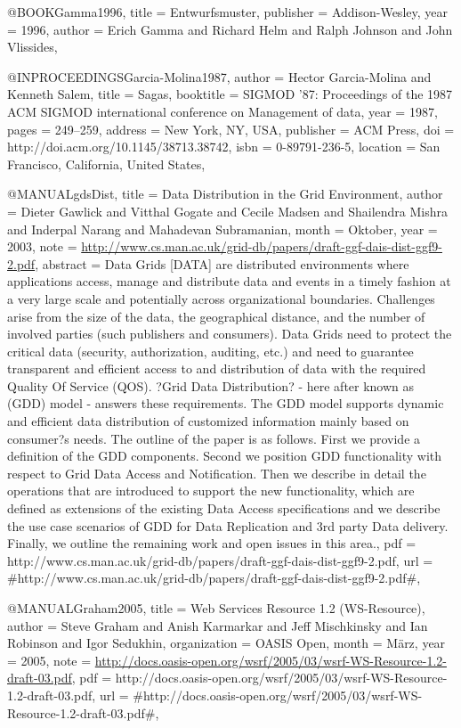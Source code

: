 @BOOK{Gamma1996,
  title = {{Entwurfsmuster}},
  publisher = {Addison-Wesley},
  year = {1996},
  author = {Erich Gamma and Richard Helm and Ralph Johnson and John Vlissides},
}

@INPROCEEDINGS{Garcia-Molina1987,
  author = {Hector Garcia-Molina and Kenneth Salem},
  title = {{Sagas}},
  booktitle = {SIGMOD '87: Proceedings of the 1987 ACM SIGMOD international conference
	on Management of data},
  year = {1987},
  pages = {249--259},
  address = {New York, NY, USA},
  publisher = {ACM Press},
  doi = {http://doi.acm.org/10.1145/38713.38742},
  isbn = {0-89791-236-5},
  location = {San Francisco, California, United States},
}

@MANUAL{gdsDist,
  title = {{Data Distribution in the Grid Environment}},
  author = {Dieter Gawlick and Vitthal Gogate and Cecile Madsen and Shailendra
	Mishra and Inderpal Narang and Mahadevan Subramanian},
  month = {Oktober},
  year = {2003},
  note = {\url{http://www.cs.man.ac.uk/grid-db/papers/draft-ggf-dais-dist-ggf9-2.pdf}},
  abstract = {Data Grids [DATA] are distributed environments where applications
	access, manage
and distribute data and events in a timely fashion
	at a very large
scale and potentially across organizational boundaries.
	Challenges
arise from the size of the data, the geographical distance,
	and the
number of involved parties (such publishers and consumers).
	Data
Grids need to protect the critical data (security, authorization,
auditing,
	etc.) and need to guarantee transparent and efficient access
to and
	distribution of data with the required Quality Of Service
(QOS).
	?Grid Data Distribution? - here after known as (GDD) model
- answers
	these requirements. The GDD model supports dynamic and
efficient
	data distribution of customized information mainly based on
consumer?s
	needs. The outline of the paper is as follows. First we
provide a
	definition of the GDD components. Second we position GDD
functionality
	with respect to Grid Data Access and Notification.
Then we describe
	in detail the operations that are introduced to
support the new functionality,
	which are defined as extensions of the
existing Data Access specifications
	and we describe the use case
scenarios of GDD for Data Replication
	and 3rd party Data delivery.
Finally, we outline the remaining work
	and open issues in this area.},
  pdf = {http://www.cs.man.ac.uk/grid-db/papers/draft-ggf-dais-dist-ggf9-2.pdf},
  url = {#http://www.cs.man.ac.uk/grid-db/papers/draft-ggf-dais-dist-ggf9-2.pdf#},
}

@MANUAL{Graham2005,
  title = {{Web Services Resource 1.2 (WS-Resource)}},
  author = {Steve Graham and Anish Karmarkar and Jeff Mischkinsky and Ian Robinson
	and Igor Sedukhin},
  organization = {OASIS Open},
  month = {März},
  year = {2005},
  note = {\url{http://docs.oasis-open.org/wsrf/2005/03/wsrf-WS-Resource-1.2-draft-03.pdf}},
  pdf = {http://docs.oasis-open.org/wsrf/2005/03/wsrf-WS-Resource-1.2-draft-03.pdf},
  url = {#http://docs.oasis-open.org/wsrf/2005/03/wsrf-WS-Resource-1.2-draft-03.pdf#},
}

